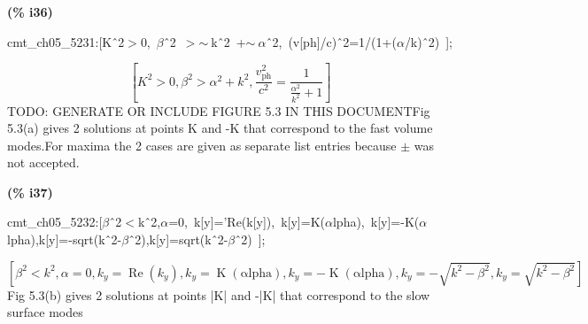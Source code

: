 \documentclass[fleqn]{article}
\begin{document}
\noindent
\begin{minipage}[t]{4.000000em}\color{red}\bfseries
(\% i36)	
\end{minipage}
\begin{minipage}[t]{\textwidth}\color{blue}
cmt\_ch05\_5231:[K\^\ 2\ensuremath{>}0,\ \ensuremath{\beta}\^\ 2\ \ensuremath{>}\ensuremath{\sim\ }k\^\ 2\ +\ensuremath{\sim\ }\ensuremath{\alpha}\^\ 2,\ (v[ph]/c)\^\ 2=1/(1+(\ensuremath{\alpha}/k)\^\ 2)\ ];
\end{minipage}
\[\displaystyle \tag{\% o36} 
\left[ {{K}^{2}}\operatorname{>  }0\operatorname{,}{{\beta }^{2}}\operatorname{>  }{{\alpha }^{2}}+{{k}^{2}}\operatorname{,}\frac{{{v}_{\ensuremath{\mathrm{ph}}}^{2}}}{{{c}^{2}}}=\frac{1}{\frac{{{\alpha }^{2}}}{{{k}^{2}}}+1}\right] \mbox{}
\]
TODO: GENERATE OR INCLUDE FIGURE 5.3 IN THIS DOCUMENTFig 5.3(a) gives 2 solutions at points K and -K that correspond to the fast volume modes.For maxima the 2 cases are given as separate list entries because \ensuremath{\pm} was not accepted.


\noindent
\begin{minipage}[t]{4.000000em}\color{red}\bfseries
(\% i37)	
\end{minipage}
\begin{minipage}[t]{\textwidth}\color{blue}
cmt\_ch05\_5232:[\ensuremath{\beta}\^\ 2\ensuremath{<}k\^\ 2,\ensuremath{\alpha}=0,\ k[y]='Re(k[y]),\ k[y]=K(\ensuremath{\alpha}lpha),\ k[y]=-K(\ensuremath{\alpha}lpha),k[y]=-sqrt(k\^\ 2-\ensuremath{\beta}\^\ 2),k[y]=sqrt(k\^\ 2-\ensuremath{\beta}\^\ 2)\ ];
\end{minipage}
\[\displaystyle \tag{\% o37} 
\operatorname{[}{{\beta }^{2}}\operatorname{<  }{{k}^{2}}\operatorname{,}\alpha =0\operatorname{,}{k_y}=\operatorname{Re}\left( {k_y}\right) \operatorname{,}{k_y}=\operatorname{K}\left( \ensuremath{\mathrm{\alpha lpha}}\right) \operatorname{,}{k_y}=-\operatorname{K}\left( \ensuremath{\mathrm{\alpha lpha}}\right) \operatorname{,}{k_y}=-\sqrt{{{k}^{2}}-{{\beta }^{2}}}\operatorname{,}{k_y}=\sqrt{{{k}^{2}}-{{\beta }^{2}}}\operatorname{]}\mbox{}
\]
Fig 5.3(b) gives 2 solutions at points |K| and -|K| that correspond to the slow surface modes
\end{document}
